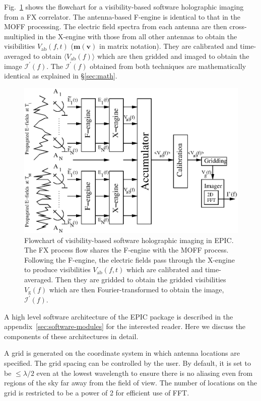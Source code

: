 \documentclass[a4paper,fleqn,usenatbib]{mnras}
\begin{document}
Fig.~\ref{fig:FX-flowchart} shows the flowchart for a visibility-based software holographic imaging from a FX correlator. The antenna-based F-engine is identical to that in the MOFF processing. The electric field spectra from each antenna are then cross-multiplied in the X-engine with those from all other antennas to obtain the visibilities $V_\textrm{ab}(f,t)$ ($\mathbf{m}(\mathbf{v})$ in matrix notation). They are calibrated and time-averaged to obtain $\langle V_\textrm{ab}(f)\rangle$ which are then gridded and imaged to obtain the image $\mathcal{I}^\prime(f)$. The $\mathcal{I}^\prime(f)$ obtained from both techniques are mathematically identical as explained in \S\ref{sec:math}.

\begin{figure}
  \includegraphics[width=\columnwidth]{figure2}
  \caption{Flowchart of visibility-based software holographic imaging in EPIC. The FX process flow shares the F-engine with the MOFF process. Following the F-engine, the electric fields pass through the X-engine to produce visibilities $V_\textrm{ab}(f,t)$ which are calibrated and time-averaged. Then they are gridded to obtain the gridded visibilities $V_\textrm{g}(f)$ which are then Fourier-transformed to obtain the image, $\mathcal{I}^\prime(f)$.}
  \label{fig:FX-flowchart}
\end{figure}

A high level software architecture of the EPIC package is described in the appendix~\ref{sec:software-modules} for the interested reader. Here we discuss the components of these architectures in detail. 

\par\medskip
{}
\par\medskip
\noindent A grid is generated on the coordinate system in which antenna locations are specified. The grid spacing can be controlled by the user. By default, it is set to be $\le\lambda/2$ even at the lowest wavelength to ensure there is no aliasing even from regions of the sky far away from the field of view. The number of locations on the grid is restricted to be a power of 2 for efficient use of FFT. 
\end{document}
